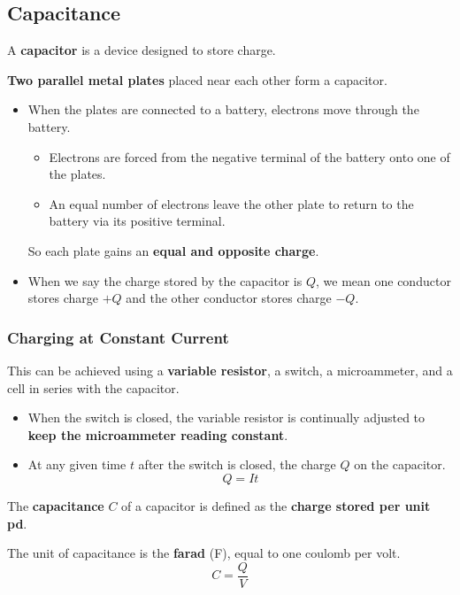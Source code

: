 \subsection{Capacitance}

A \textbf{capacitor} is a device designed to store charge.

\textbf{Two parallel metal plates} placed near each other form a capacitor.
\begin{itemize}
    \item When the plates are connected to a battery, electrons move through the battery.
        \begin{itemize}
            \item Electrons are forced from the negative terminal of the battery onto one of the plates.
            \item An equal number of electrons leave the other plate to return to the battery via its positive terminal.
        \end{itemize}

        So each plate gains an \textbf{equal and opposite charge}.
    \item When we say the charge stored by the capacitor is $Q$, we mean one conductor stores charge $+Q$ and the other conductor stores charge $-Q$.
\end{itemize}

\subsubsection*{Charging at Constant Current}

This can be achieved using a \textbf{variable resistor}, a switch, a microammeter, and a cell in series with the capacitor.
\begin{itemize}
    \item When the switch is closed, the variable resistor is continually adjusted to \textbf{keep the microammeter reading constant}.
    \item At any given time $t$ after the switch is closed, the charge $Q$ on the capacitor.
        $$Q=It$$
\end{itemize}

The \textbf{capacitance} $C$ of a capacitor is defined as the \textbf{charge stored per unit pd}.

The unit of capacitance is the \textbf{farad} (F), equal to one coulomb per volt.
$$C=\frac{Q}{V}$$

